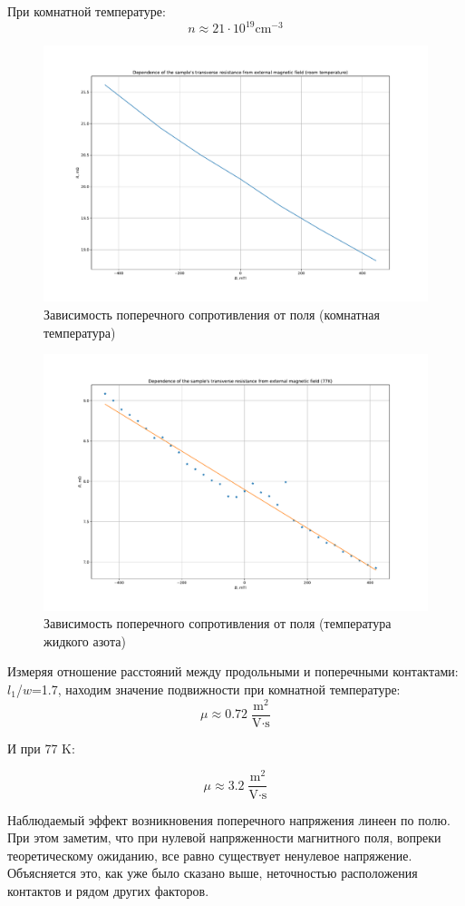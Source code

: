 \documentclass[a4paper, 12pt]{article}
\begin{document}
При комнатной температуре:
$$n\approx21 \cdot 10^{19}\text{cm}^{-3}$$ 
\begin{figure}[H]
	\centering
	\includegraphics[width=0.8\linewidth]{3_room.pdf}
	\caption{Зависимость поперечного сопротивления от поля (комнатная температура)}
	\label{fig:3_room}
\end{figure}

\begin{figure}[H]
	\centering
	\includegraphics[width=0.8\linewidth]{3_cold.pdf}
	\caption{Зависимость поперечного  сопротивления от поля (температура жидкого азота)}
	\label{fig:3_cold}
\end{figure}

Измеряя отношение расстояний между продольными и поперечными контактами: $l_1$/$w$=1.7, находим значение подвижности при комнатной температуре:
$$\mu\approx 0.72  \; \frac{\text{m}^2}{\text{V} \cdot \text{s}}$$

И при 77 K:

$$\mu\approx 3.2   \; \frac{\text{m}^2}{\text{V} \cdot \text{s}}$$

Наблюдаемый эффект возникновения поперечного напряжения линеен по полю. При этом заметим, что при нулевой напряженности магнитного поля, вопреки теоретическому ожиданию, все равно существует ненулевое напряжение. Объясняется это, как уже было сказано выше, неточностью расположения контактов и рядом других факторов. 
\end{document}
